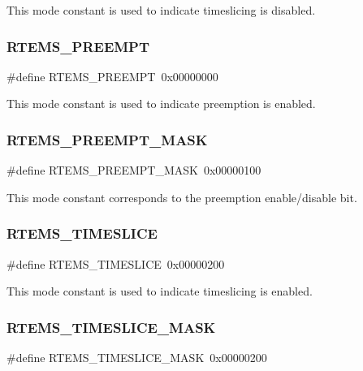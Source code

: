 This mode constant is used to indicate timeslicing is disabled. \mbox{\label{group__ClassicModes_gaf10ca77d8ec042125324421ae1c307a9}} 
\subsubsection{\texorpdfstring{RTEMS\_PREEMPT}{RTEMS\_PREEMPT}}
{\footnotesize\ttfamily \#define R\+T\+E\+M\+S\+\_\+\+P\+R\+E\+E\+M\+PT~0x00000000}

This mode constant is used to indicate preemption is enabled. \mbox{\label{group__ClassicModes_gadce57066cf804c77938d21a205c913ac}} 
\subsubsection{\texorpdfstring{RTEMS\_PREEMPT\_MASK}{RTEMS\_PREEMPT\_MASK}}
{\footnotesize\ttfamily \#define R\+T\+E\+M\+S\+\_\+\+P\+R\+E\+E\+M\+P\+T\+\_\+\+M\+A\+SK~0x00000100}

This mode constant corresponds to the preemption enable/disable bit. \mbox{\label{group__ClassicModes_ga0559c65edac08e290536d0c211171a7e}} 
\subsubsection{\texorpdfstring{RTEMS\_TIMESLICE}{RTEMS\_TIMESLICE}}
{\footnotesize\ttfamily \#define R\+T\+E\+M\+S\+\_\+\+T\+I\+M\+E\+S\+L\+I\+CE~0x00000200}

This mode constant is used to indicate timeslicing is enabled. \mbox{\label{group__ClassicModes_gae1aa7190e76d1595155514e49dd86409}} 
\subsubsection{\texorpdfstring{RTEMS\_TIMESLICE\_MASK}{RTEMS\_TIMESLICE\_MASK}}
{\footnotesize\ttfamily \#define R\+T\+E\+M\+S\+\_\+\+T\+I\+M\+E\+S\+L\+I\+C\+E\+\_\+\+M\+A\+SK~0x00000200}

